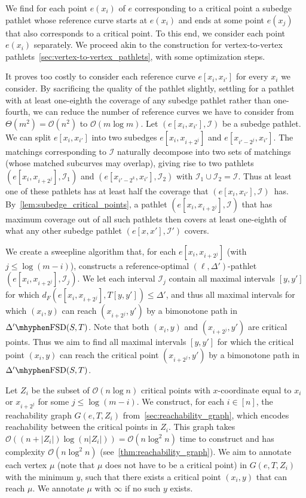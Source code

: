 \documentclass[a4paper,UKenglish,cleveref,thm-restate,notab]{lipics-v2021}
\newcommand{\dF}{\ensuremath{d_F}}
\newcommand{\FSD}[1][\Delta'] {\ensuremath{#1}\mhyphen\mathrm{FSD}}
\newcommand{\bigO}{\mathcal{O}}
\newcommand{\I}{\mathcal{I}}
\begin{document}
    We find for each point $e(x_i)$ of $e$ corresponding to a critical point a subedge pathlet whose reference curve starts at $e(x_i)$ and ends at some point $e(x_j)$ that also corresponds to a critical point.
    To this end, we consider each point $e(x_i)$ separately.
    We proceed akin to the construction for vertex-to-vertex pathlets~\cref{sec:vertex-to-vertex_pathlets}, with some optimization steps.
    
    It proves too costly to consider each reference curve $e[x_i, x_{i'}]$ for every $x_i$ we consider.
    By sacrificing the quality of the pathlet slightly, settling for a pathlet with at least one-eighth the coverage of any subedge pathlet rather than one-fourth, we can reduce the number of reference curves we have to consider from $\Theta(m^2) = \bigO(n^2)$ to $\bigO(m \log m)$.
    Let $(e[x_i, x_{i'}], \I)$ be a subedge pathlet.
    We can split $e[x_i, x_{i'}]$ into two subedges $e[x_i, x_{i+2^j}]$ and $e[x_{i'-2^j}, x_{i'}]$.
    The matchings corresponding to $\I$ naturally decompose into two sets of matchings (whose matched subcurves may overlap), giving rise to two pathlets $(e[x_i, x_{i+2^j}], \I_1)$ and $(e[x_{i'-2^k}, x_{i'}], \I_2)$ with $\I_1 \cup \I_2 = \I$.
    Thus at least one of these pathlets has at least half the coverage that $(e[x_i, x_{i'}], \I)$~has.
    By~\cref{lem:subedge_critical_points}, a pathlet $(e[x_i, x_{i+2^j}], \I)$ that has maximum coverage out of all such pathlets then covers at least one-eighth of what any other subedge pathlet $(e[x, x'], \I')$ covers.

    We create a sweepline algorithm that, for each $e[x_i, x_{i+2^j}]$ (with $j \leq \log (m-i)$), constructs a reference-optimal $(\ell, \Delta')$-pathlet $(e[x_i, x_{i+2^j}], \I_j)$.
    We let each interval $\I_j$ contain all maximal intervals $[y, y']$ for which $\dF(e[x_i, x_{i+2^j}], T[y, y']) \leq \Delta'$, and thus all maximal intervals for which $(x_i, y)$ can reach $(x_{i+2^j}, y')$ by a bimonotone path in $\FSD(S, T)$.
    Note that both $(x_i, y)$ and $(x_{i+2^j}, y')$ are critical points.
    Thus we aim to find all maximal intervals $[y, y']$ for which the critical point $(x_i, y)$ can reach the critical point $(x_{i+2^j}, y')$ by a bimonotone path in $\FSD(S, T)$.

    Let $Z_i$ be the subset of $\bigO(n \log n)$ critical points with $x$-coordinate equal to $x_i$ or $x_{i+2^j}$ for some $j \leq \log (m-i)$.
    We construct, for each $i \in [n]$, the reachability graph $G(e, T, Z_i)$ from~\cref{sec:reachability_graph}, which encodes reachability between the critical points in $Z_i$.
    This graph takes $\bigO((n + |Z_i|) \log (n|Z_i|)) = \bigO(n \log^2 n)$ time to construct and has complexity $\bigO(n \log^2 n)$ (see~\cref{thm:reachability_graph}).
    We aim to annotate each vertex $\mu$ (note that $\mu$ does not have to be a critical point) in $G(e, T, Z_i)$ with the minimum $y$, such that there exists a critical point $(x_i, y)$ that can reach $\mu$.
    We annotate $\mu$ with $\infty$ if no such $y$ exists.
    
\end{document}

